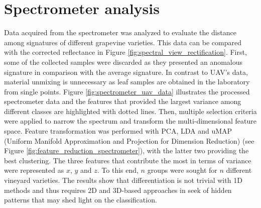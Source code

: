 \section{Spectrometer analysis}

Data acquired from the spectrometer was analyzed to evaluate the distance among signatures of different grapevine varieties. This data can be compared with the corrected reflectance in Figure \ref{fig:spectral_view_rectification}. First, some of the collected samples were discarded as they presented an anomalous signature in comparison with the average signature. In contrast to UAV's data, material unmixing is unnecessary as leaf samples are obtained in the laboratory from single points. Figure \ref{fig:spectrometer_uav_data} illustrates the processed spectrometer data and the features that provided the largest variance among different classes are highlighted with dotted lines. Then, multiple selection criteria were applied to narrow the spectrum and transform the multi-dimensional feature space. Feature transformation was performed with PCA, LDA and uMAP (Uniform Manifold Approximation and Projection for Dimension Reduction) (see Figure \ref{fig:feature_reduction_spectrometer}), with the latter two providing the best clustering. The three features that contribute the most in terms of variance were represented as $x$, $y$ and $z$. To this end, $n$ groups were sought for $n$ different vineyard varieties. The results show that differentiation is not trivial with 1D methods and thus requires 2D and 3D-based approaches in seek of hidden patterns that may shed light on the classification.

